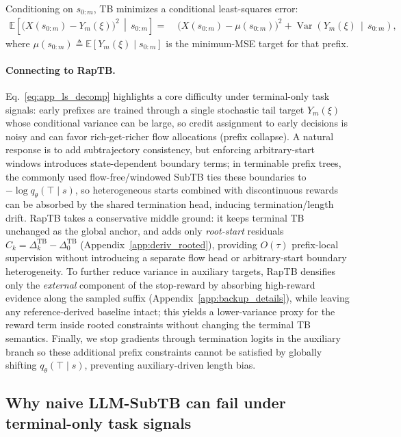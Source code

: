 \documentclass{article}
\theoremstyle{plain}
\theoremstyle{definition}
\theoremstyle{remark}
\begin{document}
Conditioning on $s_{0:m}$, TB minimizes a conditional least-squares error:
\begin{align}
\label{eq:app_ls_decomp}
\mathbb{E}\!\left[\big(X(s_{0:m})-Y_m(\xi)\big)^2 \,\middle|\, s_{0:m}\right]
=\;&
\big(X(s_{0:m})-\mu(s_{0:m})\big)^2
+ \operatorname{Var}\!\left(Y_m(\xi)\,\middle|\, s_{0:m}\right),
\end{align}
where $\mu(s_{0:m})\triangleq \mathbb{E}[Y_m(\xi)\mid s_{0:m}]$ is the minimum-MSE target for that prefix.

\paragraph{Connecting to RapTB.}
Eq.~\eqref{eq:app_ls_decomp} highlights a core difficulty under terminal-only task signals: early prefixes are trained through a
single stochastic tail target $Y_m(\xi)$ whose conditional variance can be large, so credit assignment to early decisions is noisy and can
favor rich-get-richer flow allocations (prefix collapse).
A natural response is to add subtrajectory consistency, but enforcing arbitrary-start windows introduces state-dependent boundary terms; in
terminable prefix trees, the commonly used flow-free/windowed SubTB ties these boundaries to $-\log q_\theta(\top\mid s)$, so heterogeneous
starts combined with discontinuous rewards can be absorbed by the shared termination head, inducing termination/length drift.
RapTB takes a conservative middle ground: it keeps terminal TB unchanged as the global anchor, and adds only \emph{root-start} residuals
$C_k=\Delta_k^{\mathrm{TB}}-\Delta_0^{\mathrm{TB}}$ (Appendix~\ref{app:deriv_rooted}), providing $O(\tau)$ prefix-local supervision without introducing a separate
flow head or arbitrary-start boundary heterogeneity.
To further reduce variance in auxiliary targets, RapTB densifies only the \emph{external} component of the stop-reward by absorbing high-reward
evidence along the sampled suffix (Appendix~\ref{app:backup_details}), while leaving any reference-derived baseline intact; this yields a lower-variance
proxy for the reward term inside rooted constraints without changing the terminal TB semantics.
Finally, we stop gradients through termination logits in the auxiliary branch so these additional prefix constraints cannot be satisfied by globally
shifting $q_\theta(\top\mid s)$, preventing auxiliary-driven length bias.

\subsection{Why naive LLM-SubTB can fail under terminal-only task signals}
\label{app:deriv_naive_subtb}
\end{document}
